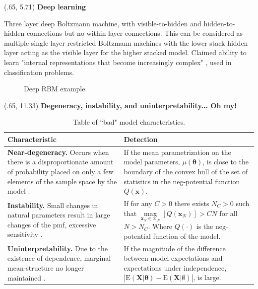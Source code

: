 \documentclass[extrafontsizes, 30pt]{memoir}
\begin{document}
\begin{textblock}{14}(.65, 5.71)
{\large \bfseries Deep learning} \\[.25cm]
\begin{minipage}{.62\textwidth}
Three layer deep Boltzmann machine, with visible-to-hidden and hidden-to-hidden connections but no within-layer connections. This can be considered as multiple single layer restricted Boltzmann machines with the lower stack hidden layer acting as the visible layer for the higher stacked model. Claimed ability to learn "internal representations that become increasingly complex" \cite{salakhutdinov2009deep}, used in classification problems.
\end{minipage}
\begin{minipage}{.38\textwidth}
\begin{figure}
  \centering
  
  \caption{Deep RBM example.}
  \label{fig:deep_rbm}
\end{figure}
\end{minipage}


\end{textblock}

\begin{textblock}{14}(.65, 11.33)
{\large \bfseries Degeneracy, instability, and uninterpretability... Oh my!}
~\\[.25cm]
\begin{table}
\centering
\begin{tabular}{| p{.48\linewidth} | p{.5\linewidth} |}
\hline
Characteristic & Detection \\
\hline
\hline
{\bfseries Near-degeneracy.} Occurs when there is a disproportionate amount of probability placed on only a few elements of the sample space by the model \cite{handcock2003assessing}. & If the mean parametrization on the model parameters, $\mu(\boldsymbol \theta)$, is close to the boundary of the convex hull of the set of statistics in the neg-potential function $Q(\boldsymbol x)$. \\
\hline
{\bfseries Instability.} Small changes in natural parameters result in large changes of the pmf, excessive sensitivity \cite{schweinberger2011instability}. & If for any $C > 0$ there exists $N_C > 0$ such that 
$\max\limits_{\boldsymbol x_N \in \mathcal{X}_N}[Q(\boldsymbol x_N)] > CN$ for all $N > N_C$. Where $Q(\cdot)$ is the neg-potential function of the model. \\
\hline
{\bfseries Uninterpretability.} Due to the existence of dependence, marginal mean-structure no longer maintained \cite{kaiser2007statistical}. & If the magnitude of the difference between model expectations and expectations under independence, $\left|\text{E}(\boldsymbol X | \boldsymbol \theta) - \text{E}(\boldsymbol X | \emptyset ) \right|$, is large.\\
\hline
\end{tabular}
\label{tab:degen}
\caption{Table of ``bad" model characteristics.}
\end{table}
\end{textblock}
\end{document}
